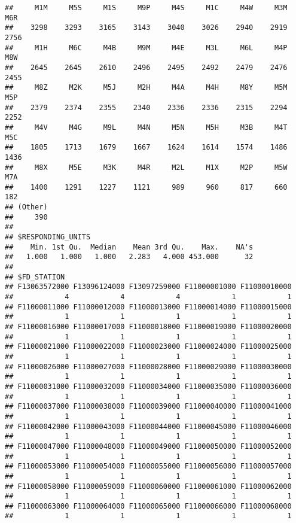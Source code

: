 \documentclass[]{article}
\begin{document}
\begin{verbatim}
##     M1M     M5S     M1S     M9P     M4S     M1C     M4W     M3M     M6R 
##    3298    3293    3165    3143    3040    3026    2940    2919    2756 
##     M1H     M6C     M4B     M9M     M4E     M3L     M6L     M4P     M8W 
##    2645    2645    2610    2496    2495    2492    2479    2476    2455 
##     M8Z     M2K     M5J     M2H     M4A     M4H     M8Y     M5M     M5P 
##    2379    2374    2355    2340    2336    2336    2315    2294    2252 
##     M4V     M4G     M9L     M4N     M5N     M5H     M3B     M4T     M5C 
##    1805    1713    1679    1667    1624    1614    1574    1486    1436 
##     M8X     M5E     M3K     M4R     M2L     M1X     M2P     M5W     M7A 
##    1400    1291    1227    1121     989     960     817     660     182 
## (Other) 
##     390 
## 
## $RESPONDING_UNITS
##    Min. 1st Qu.  Median    Mean 3rd Qu.    Max.    NA's 
##   1.000   1.000   1.000   2.283   4.000 453.000      32 
## 
## $FD_STATION
## F13063572000 F13096124000 F13097259000 F11000001000 F11000010000 
##            4            4            4            1            1 
## F11000011000 F11000012000 F11000013000 F11000014000 F11000015000 
##            1            1            1            1            1 
## F11000016000 F11000017000 F11000018000 F11000019000 F11000020000 
##            1            1            1            1            1 
## F11000021000 F11000022000 F11000023000 F11000024000 F11000025000 
##            1            1            1            1            1 
## F11000026000 F11000027000 F11000028000 F11000029000 F11000030000 
##            1            1            1            1            1 
## F11000031000 F11000032000 F11000034000 F11000035000 F11000036000 
##            1            1            1            1            1 
## F11000037000 F11000038000 F11000039000 F11000040000 F11000041000 
##            1            1            1            1            1 
## F11000042000 F11000043000 F11000044000 F11000045000 F11000046000 
##            1            1            1            1            1 
## F11000047000 F11000048000 F11000049000 F11000050000 F11000052000 
##            1            1            1            1            1 
## F11000053000 F11000054000 F11000055000 F11000056000 F11000057000 
##            1            1            1            1            1 
## F11000058000 F11000059000 F11000060000 F11000061000 F11000062000 
##            1            1            1            1            1 
## F11000063000 F11000064000 F11000065000 F11000066000 F11000068000 
##            1            1            1            1            1 

\end{verbatim}
\end{document}
